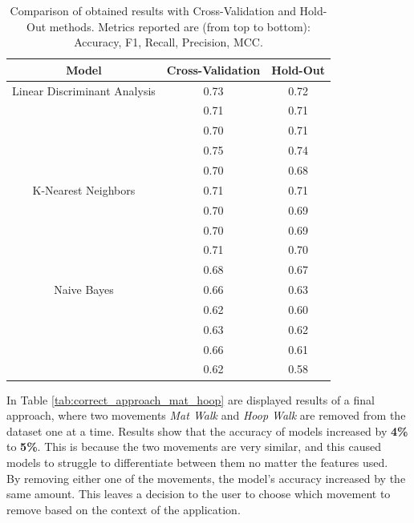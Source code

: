                 \begin{table}[htbp]
                    \centering
                    \begin{tabular}{|c|c|c|}
                    \hline
                    \textbf{Model} & \textbf{Cross-Validation} & \textbf{Hold-Out} \\ \hline
                        Linear Discriminant Analysis    & 0.73 & 0.72 \\ 
                                                        & 0.71 & 0.71 \\ 
                                                        & 0.70 & 0.71 \\ 
                                                        & 0.75 & 0.74 \\
                                                        & 0.70 & 0.68 \\ 
                                                        \hline
                        K-Nearest Neighbors             & 0.71 & 0.71 \\ 
                                                        & 0.70 & 0.69 \\ 
                                                        & 0.70 & 0.69 \\ 
                                                        & 0.71 & 0.70 \\
                                                        & 0.68 & 0.67 \\
                                                        \hline
                        Naive Bayes                     & 0.66 & 0.63 \\ 
                                                        & 0.62 & 0.60 \\ 
                                                        & 0.63 & 0.62 \\
                                                        & 0.66 & 0.61 \\ 
                                                        & 0.62 & 0.58 \\ 
                                                        \hline
                    \end{tabular}
                    \caption{Comparison of obtained results with Cross-Validation and Hold-Out methods. Metrics reported are (from top to bottom): Accuracy, F1, Recall, Precision, MCC.}
                    \label{tab:correct_approach_cv}
                \end{table}
                \newpage
                In Table \ref{tab:correct_approach_mat_hoop} are displayed results of a final approach, where two movements \textit{Mat Walk} and \textit{Hoop Walk} are removed from the dataset one at a time. Results show that the accuracy of models increased by \textbf{4\%} to \textbf{5\%}. This is because the two movements are very similar, and this caused models to struggle to differentiate between them no matter the features used. \\
                By removing either one of the movements, the model's accuracy increased by the same amount. This leaves a decision to the user to choose which movement to remove based on the context of the application. 

